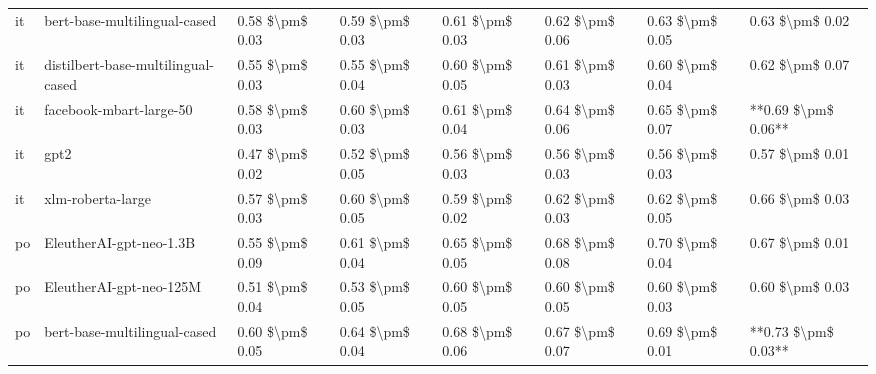 \begin{tabular}{llllllll}
      it &       bert-base-multilingual-cased & 0.58 \$\textbackslash pm\$ 0.03 &           0.59 \$\textbackslash pm\$ 0.03 &       0.61 \$\textbackslash pm\$ 0.03 &        0.62 \$\textbackslash pm\$ 0.06 &                         0.63 \$\textbackslash pm\$ 0.05 &     0.63 \$\textbackslash pm\$ 0.02 \\
      it & distilbert-base-multilingual-cased & 0.55 \$\textbackslash pm\$ 0.03 &           0.55 \$\textbackslash pm\$ 0.04 &       0.60 \$\textbackslash pm\$ 0.05 &        0.61 \$\textbackslash pm\$ 0.03 &                         0.60 \$\textbackslash pm\$ 0.04 &     0.62 \$\textbackslash pm\$ 0.07 \\
      it &            facebook-mbart-large-50 & 0.58 \$\textbackslash pm\$ 0.03 &           0.60 \$\textbackslash pm\$ 0.03 &       0.61 \$\textbackslash pm\$ 0.04 &        0.64 \$\textbackslash pm\$ 0.06 &                         0.65 \$\textbackslash pm\$ 0.07 & **0.69 \$\textbackslash pm\$ 0.06** \\
      it &                               gpt2 & 0.47 \$\textbackslash pm\$ 0.02 &           0.52 \$\textbackslash pm\$ 0.05 &       0.56 \$\textbackslash pm\$ 0.03 &        0.56 \$\textbackslash pm\$ 0.03 &                         0.56 \$\textbackslash pm\$ 0.03 &     0.57 \$\textbackslash pm\$ 0.01 \\
      it &                  xlm-roberta-large & 0.57 \$\textbackslash pm\$ 0.03 &           0.60 \$\textbackslash pm\$ 0.05 &       0.59 \$\textbackslash pm\$ 0.02 &        0.62 \$\textbackslash pm\$ 0.03 &                         0.62 \$\textbackslash pm\$ 0.05 &     0.66 \$\textbackslash pm\$ 0.03 \\
      po &            EleutherAI-gpt-neo-1.3B & 0.55 \$\textbackslash pm\$ 0.09 &           0.61 \$\textbackslash pm\$ 0.04 &       0.65 \$\textbackslash pm\$ 0.05 &        0.68 \$\textbackslash pm\$ 0.08 &                         0.70 \$\textbackslash pm\$ 0.04 &     0.67 \$\textbackslash pm\$ 0.01 \\
      po &            EleutherAI-gpt-neo-125M & 0.51 \$\textbackslash pm\$ 0.04 &           0.53 \$\textbackslash pm\$ 0.05 &       0.60 \$\textbackslash pm\$ 0.05 &        0.60 \$\textbackslash pm\$ 0.05 &                         0.60 \$\textbackslash pm\$ 0.03 &     0.60 \$\textbackslash pm\$ 0.03 \\
      po &       bert-base-multilingual-cased & 0.60 \$\textbackslash pm\$ 0.05 &           0.64 \$\textbackslash pm\$ 0.04 &       0.68 \$\textbackslash pm\$ 0.06 &        0.67 \$\textbackslash pm\$ 0.07 &                         0.69 \$\textbackslash pm\$ 0.01 & **0.73 \$\textbackslash pm\$ 0.03** \\

\end{tabular}
